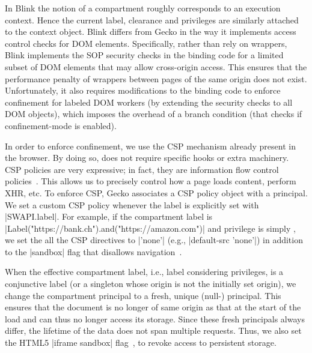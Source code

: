 In Blink the notion of a compartment roughly corresponds to an
execution context.
%
Hence the current label, clearance and privileges are similarly
attached to the context object. 
%
Blink differs from Gecko in the way it implements access control checks for
DOM elements. 
%
Specifically, rather than rely on wrappers, Blink implements the SOP security
checks in the binding code for a limited subset of DOM elements that may allow
cross-origin access.
%
This ensures that the performance penalty of wrappers between pages of the same
origin does not exist.
%
Unfortunately, it also requires modifications to the binding code to
enforce confinement for labeled DOM workers (by extending the security
checks to all DOM objects), which imposes the overhead of a branch
condition (that checks if confinement-mode is enabled).

 
%
In order to enforce confinement, we use the CSP mechanism already present 
in the browser. 
By doing so, \sys{} does not require specific hooks or extra machinery. 
CSP policies are very expressive; in fact, they are
information flow control policies~\cite{yang:2013:towards}. This allows us
to precisely control how a page loads content, perform XHR, etc.
To enforce CSP, Gecko associates a CSP policy object with a principal.
%
We set a custom CSP policy whenever the label is
explicitly set with \js|SWAPI.label|.
%
For example, if the compartment label is
\js|Label("https://bank.ch").and("https://amazon.com")| and privilege
is simply , we set the all the CSP directives to
\js|'none'| (e.g., \js|default-src 'none'|) in addition to the
\js|sandbox| flag that disallows
navigation~\cite{csp1.1,whatwg-html,html5}.
%

When the effective compartment label, i.e., label considering
privileges, is a conjunctive label (or a singleton whose origin is not
the initially set origin), we change the compartment principal to a
fresh, unique (null-) principal. 
%
This ensures that the document is no longer of same origin as that
at the start of the load and can thus no longer access its storage.
%
Since these fresh principals always differ, the lifetime of the data does not
span multiple requests.
%
Thus, we also set the HTML5 \js|iframe sandbox| flag~\cite{html5},
to revoke access to persistent storage.


